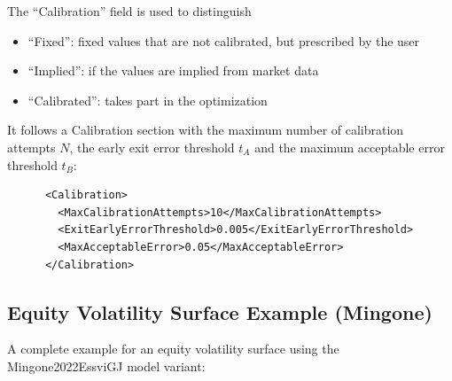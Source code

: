 \documentclass{amsart}
\theoremstyle{plain}
\numberwithin{equation}{section}
\begin{document}
The ``Calibration'' field is used to distinguish

\begin{itemize}
\item ``Fixed'': fixed values that are not calibrated, but prescribed by the user
\item ``Implied'': if the values are implied from market data
\item ``Calibrated'': takes part in the optimization
\end{itemize}

It follows a Calibration section with the maximum number of calibration attempts $N$, the early exit error threshold
$t_A$ and the maximum acceptable error threshold $t_B$:

\begin{verbatim}
      <Calibration>
        <MaxCalibrationAttempts>10</MaxCalibrationAttempts>
        <ExitEarlyErrorThreshold>0.005</ExitEarlyErrorThreshold>
        <MaxAcceptableError>0.05</MaxAcceptableError>
      </Calibration>
\end{verbatim}

\subsection{Equity Volatility Surface Example (Mingone)}

A complete example for an equity volatility surface using the Mingone2022EssviGJ model variant:
\end{document}
